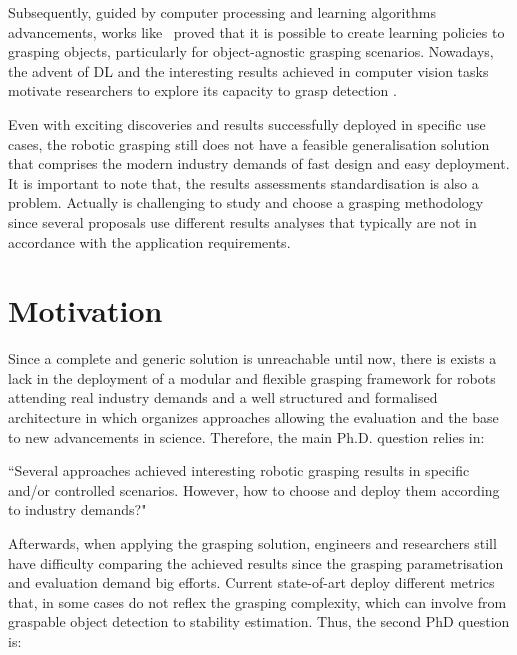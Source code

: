 Subsequently, guided by computer processing and learning algorithms advancements,  works like~\cite{Saxena2008} proved that it is possible to create learning policies to grasping objects, particularly for object-agnostic grasping scenarios. Nowadays, the advent of \ac{DL} and the interesting results achieved in computer vision tasks motivate researchers to explore its capacity to grasp detection \cite{Lenz2015,Redmon2015,Kumra2017,Watson2017,Chu2018,asif2018ensemblenet, Chen2020, Guo2017,Gariepy2019,Mousavian_2019_ICCV,Ghazaei2019,TenPas2017,Chen2019,
Mahler2016,Mahler2017b, Mahler2017d, Mahler2017,Mahler2019,song2020novel}. 

Even with exciting discoveries and results successfully deployed in specific use cases, the robotic grasping still does not have a feasible generalisation solution that comprises the modern industry demands of fast design and easy deployment. It is important to note that, the results assessments standardisation is also a problem. Actually is challenging to study and choose a grasping methodology since several proposals use different results analyses that typically are not in accordance with the application requirements. 


\section{Motivation}
\label{cap1:introduction:motiviation}




Since a complete and generic solution is unreachable until now, there is exists a lack in the deployment of a modular and flexible grasping framework for robots attending real industry demands and a well structured and formalised architecture in which organizes approaches allowing the evaluation and the base to new advancements in science. Therefore, the main Ph.D. question relies in:

\begin{flushright}
``Several approaches achieved interesting robotic grasping results in specific and/or controlled scenarios. However, how to choose and deploy them according to industry demands?"
\end{flushright}

Afterwards, when applying the grasping solution, engineers and researchers still have difficulty comparing the achieved results since the grasping parametrisation and evaluation demand big efforts. Current state-of-art deploy different metrics that, in some cases do not reflex the grasping complexity, which can involve from graspable object detection to stability estimation. Thus, the second PhD question is:

